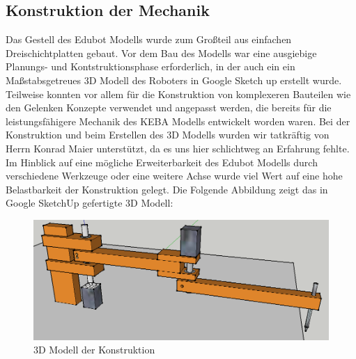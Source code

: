 \subsection{Konstruktion der Mechanik}
Das Gestell des Edubot Modells wurde zum Großteil aus einfachen Dreischichtplatten gebaut. Vor dem Bau des Modells war eine ausgiebige Planungs- und Kontstruktionsphase erforderlich, in der auch ein ein Maßstabsgetreues 3D Modell des Roboters in Google Sketch up erstellt wurde.
Teilweise konnten vor allem für die Konstruktion von komplexeren Bauteilen wie den Gelenken Konzepte verwendet und angepasst werden, die bereits für die leistungsfähigere Mechanik des KEBA Modells entwickelt worden waren.
Bei der Konstruktion und beim Erstellen des 3D Modells wurden wir tatkräftig von Herrn Konrad Maier unterstützt, da es uns hier schlichtweg an Erfahrung fehlte.
Im Hinblick auf eine mögliche Erweiterbarkeit des Edubot Modells durch verschiedene Werkzeuge oder eine weitere Achse wurde viel Wert auf eine hohe Belastbarkeit der Konstruktion gelegt.
Die Folgende Abbildung zeigt das in Google SketchUp gefertigte 3D Modell:

\begin{figure}[H]
  \centering
  \begin{minipage}[t]{12 cm}
  	\centering
  	\includegraphics[width=12cm]{images/edubot_complete} 
    \caption{3D Modell der Konstruktion}
  \end{minipage}
\end{figure}

